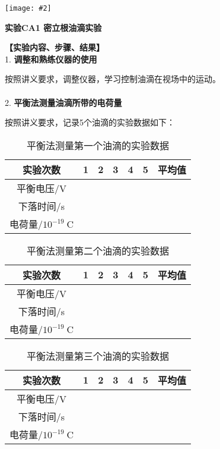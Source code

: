 \documentclass[11pt,a4paper]{ctexart}
\newcommand{\ExpeName}{实验CA1 密立根油滴实验}
\newcommand{\cpic}[2]{
\begin{center}
\texttt{[image: \#2]}
\end{center}
}
\begin{document}
\newpage%
\cpic{0.255}{e2}%
\begin{center}
\LARGE{\textbf{\ExpeName}}
\end{center}
\textbf{【实验内容、步骤、结果】}\\
1. \textbf{调整和熟练仪器的使用}\par
按照讲义要求，调整仪器，学习控制油滴在视场中的运动。
\\
\ 
\\
2. \textbf{平衡法测量油滴所带的电荷量}\par
按照讲义要求，记录5个油滴的实验数据如下：
\begin{table}[h!]
\centering
\caption{平衡法测量第一个油滴的实验数据}
\label{my-label}
\begin{tabular}{|c|p{12mm}|p{12mm}|p{12mm}|p{12mm}|p{12mm}|p{12mm}|}
\hline
实验次数 & 1 & 2 & 3 & 4 & 5 & 平均值 \\ \hline
平衡电压/V &  &  &  &  &  &  \\ \hline
下落时间/s &  &  &  &  &  &  \\ \hline
电荷量/$10^{-19}\mathrm{\ C}$ &  &  &  &  &  &  \\ \hline
\end{tabular}
\end{table}
\begin{table}[h!]
\centering
\caption{平衡法测量第二个油滴的实验数据}
\label{my-label}
\begin{tabular}{|c|p{12mm}|p{12mm}|p{12mm}|p{12mm}|p{12mm}|p{12mm}|}
\hline
实验次数 & 1 & 2 & 3 & 4 & 5 & 平均值 \\ \hline
平衡电压/V &  &  &  &  &  &  \\ \hline
下落时间/s &  &  &  &  &  &  \\ \hline
电荷量/$10^{-19}\mathrm{\ C}$ &  &  &  &  &  &  \\ \hline
\end{tabular}
\end{table}
\begin{table}[h!]
\centering
\caption{平衡法测量第三个油滴的实验数据}
\label{my-label}
\begin{tabular}{|c|p{12mm}|p{12mm}|p{12mm}|p{12mm}|p{12mm}|p{12mm}|}
\hline
实验次数 & 1 & 2 & 3 & 4 & 5 & 平均值 \\ \hline
平衡电压/V &  &  &  &  &  &  \\ \hline
下落时间/s &  &  &  &  &  &  \\ \hline
电荷量/$10^{-19}\mathrm{\ C}$ &  &  &  &  &  &  \\ \hline
\end{tabular}
\end{table}
\end{document}
